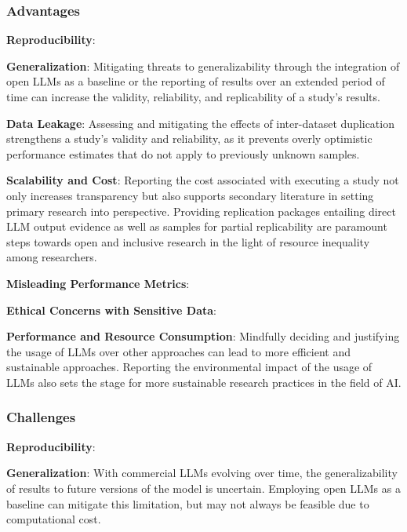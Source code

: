 \begin{itemize}
\subsubsection{Advantages}
\textbf{Reproducibility}:

\textbf{Generalization}:
Mitigating threats to generalizability through the integration of open LLMs as a baseline or the reporting of results over an extended period of time can increase the validity, reliability, and replicability of a study's results.

\textbf{Data Leakage}:
Assessing and mitigating the effects of inter-dataset duplication strengthens a study's validity and reliability, as it prevents overly optimistic performance estimates that do not apply to previously unknown samples.

\textbf{Scalability and Cost}:
Reporting the cost associated with executing a study not only increases transparency but also supports secondary literature in setting primary research into perspective.
Providing replication packages entailing direct LLM output evidence as well as samples for partial replicability are paramount steps towards open and inclusive research in the light of resource inequality among researchers.

\textbf{Misleading Performance Metrics}:

\textbf{Ethical Concerns with Sensitive Data}:

\textbf{Performance and Resource Consumption}:
Mindfully deciding and justifying the usage of LLMs over other approaches can lead to more efficient and sustainable approaches. 
Reporting the environmental impact of the usage of LLMs also sets the stage for more sustainable research practices in the field of AI.

\subsubsection{Challenges}
\textbf{Reproducibility}:

\textbf{Generalization}:
With commercial LLMs evolving over time, the generalizability of results to future versions of the model is uncertain. Employing open LLMs as a baseline can mitigate this limitation, but may not always be feasible due to computational cost.


\end{itemize}
